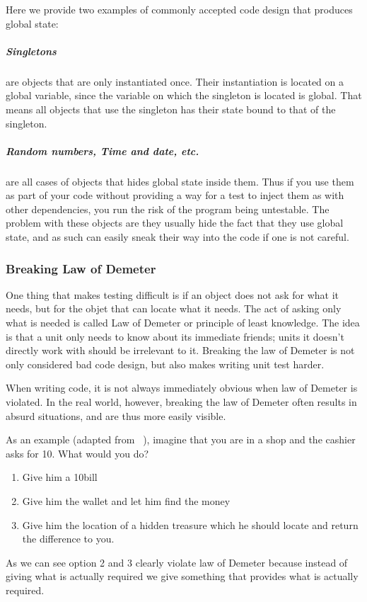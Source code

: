 Here we provide two examples of commonly accepted code design that
produces global state:


\subparagraph*{Singletons}

are objects that are only instantiated once. Their instantiation is
located on a global variable, since the variable on which the singleton
is located is global. That means all objects that use the singleton
has their state bound to that of the singleton.


\subparagraph*{Random numbers, Time and date, etc.}

are all cases of objects that hides global state inside them. Thus
if you use them as part of your code without providing a way for a
test to inject them as with other dependencies, you run the risk of
the program being untestable. The problem with these objects are they
usually hide the fact that they use global state, and as such can
easily sneak their way into the code if one is not careful. 


\subsubsection*{Breaking Law of Demeter}

One thing that makes testing difficult is if an object does not ask
for what it needs, but for the objet that can locate what it needs.
The act of asking only what is needed is called Law of Demeter or
principle of least knowledge. The idea is that a unit only needs to
know about its immediate friends; units it doesn\textquoteright{}t
directly work with should be irrelevant to it. Breaking the law of
Demeter is not only considered bad code design, but also makes writing
unit test harder.

When writing code, it is not always immediately obvious when law of
Demeter is violated. In the real world, however, breaking the law
of Demeter often results in absurd situations, and are thus more easily
visible.

As an example (adapted from ~\cite{WikiDemeter}), imagine that you
are in a shop and the cashier asks for 10\texteuro. What would you
do?
\begin{enumerate}
\item Give him a 10\texteuro bill
\item Give him the wallet and let him find the money
\item Give him the location of a hidden treasure which he should locate
and return the difference to you.
\end{enumerate}
As we can see option 2 and 3 clearly violate law of Demeter because
instead of giving what is actually required we give something that
provides what is actually required.

